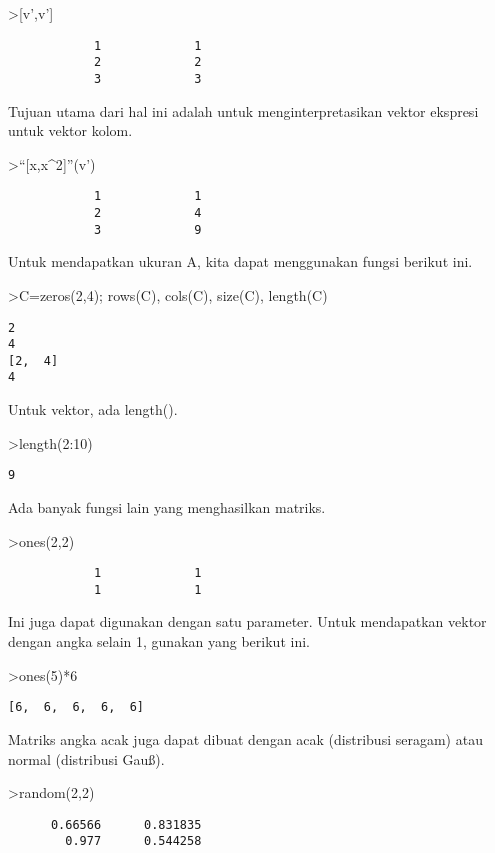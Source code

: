 \documentclass[
]{book}
\begin{document}
\textgreater{[}v',v'{]}

\begin{verbatim}
            1             1 
            2             2 
            3             3 
\end{verbatim}

Tujuan utama dari hal ini adalah untuk menginterpretasikan vektor ekspresi untuk vektor kolom.

\textgreater{}``{[}x,x\^{}2{]}''(v')

\begin{verbatim}
            1             1 
            2             4 
            3             9 
\end{verbatim}

Untuk mendapatkan ukuran A, kita dapat menggunakan fungsi berikut ini.

\textgreater C=zeros(2,4); rows(C), cols(C), size(C), length(C)

\begin{verbatim}
2
4
[2,  4]
4
\end{verbatim}

Untuk vektor, ada length().

\textgreater length(2:10)

\begin{verbatim}
9
\end{verbatim}

Ada banyak fungsi lain yang menghasilkan matriks.

\textgreater ones(2,2)

\begin{verbatim}
            1             1 
            1             1 
\end{verbatim}

Ini juga dapat digunakan dengan satu parameter. Untuk mendapatkan vektor dengan angka selain 1, gunakan yang berikut ini.

\textgreater ones(5)*6

\begin{verbatim}
[6,  6,  6,  6,  6]
\end{verbatim}

Matriks angka acak juga dapat dibuat dengan acak (distribusi seragam) atau normal (distribusi Gauß).

\textgreater random(2,2)

\begin{verbatim}
      0.66566      0.831835 
        0.977      0.544258 
\end{verbatim}
\end{document}
